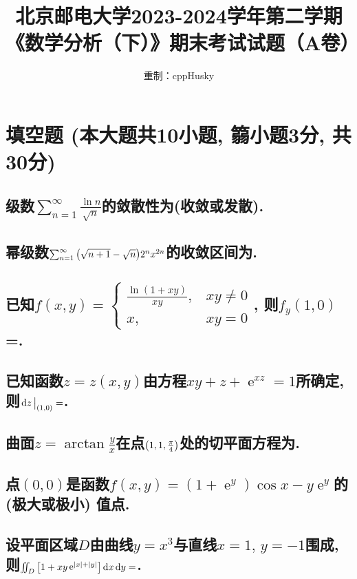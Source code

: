 \documentclass[12pt]{ctexart}
\title{北京邮电大学2023-2024学年第二学期\\《数学分析（下）》期末考试试题（A卷）}
\author{重制：cppHusky}
\date{}
\DeclareMathOperator{\ee}{\mathrm{e}}
\begin{document}
\pagestyle{fancy}
\fancyhf{}
\maketitle
\thispagestyle{fancy}
\section{填空题 (本大题共10小题, 篛小题3分, 共30分)}
\subsection{级数$\sum_{n=1}^{\infty}\frac{\ln{n}}{\sqrt{n}}$的敛散性为\blank(收敛或发散).}
\subsection{幂级数$\sum_{n=1}^{\infty}\qty(\sqrt{n+1}-\sqrt{n})2^{n}x^{2n}$的收敛区间为\blank.}
\subsection{已知$f(x,y)=\begin{cases}
	\frac{\ln(1+xy)}{xy},&xy\ne0\\
	x,&xy=0
\end{cases}$, 则$f_y(1,0)$=\blank.}
\subsection{已知函数$z=z(x,y)$由方程$xy+z+\ee^{xz}=1$所确定, 则$\eval{\dd{z}}_{(1,0)}=$\blank.}
\subsection{曲面$z=\arctan{\frac{y}{x}}$在点$\qty(1,1,\frac{\pi}{4})$处的切平面方程为\blank.}
\subsection{点$(0,0)$是函数$f(x,y)=(1+\ee^{y})\cos{x}-y\ee^{y}$的\blank(极大或极小) 值点.}
\subsection{设平面区域$D$由曲线$y=x^{3}$与直线$x=1,\,y=-1$围成, 则$\iint_{D}\qty[1+xy\ee^{\abs{x}+\abs{y}}]\dd{x}\dd{y}=$\blank.}
\end{document}
